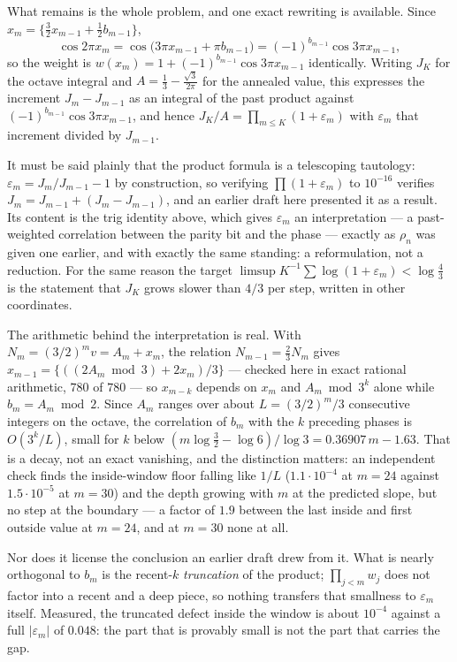 \documentclass[11pt]{article}
\theoremstyle{remark}
\newcommand{\eps}{\varepsilon}
\begin{document}
What remains is the whole problem, and one exact rewriting is available. Since
$x_m=\{\tfrac32x_{m-1}+\tfrac12b_{m-1}\}$,
\[
  \cos2\pi x_m=\cos\bigl(3\pi x_{m-1}+\pi b_{m-1}\bigr)=(-1)^{b_{m-1}}\cos3\pi x_{m-1},
\]
so the weight is $w(x_m)=1+(-1)^{b_{m-1}}\cos3\pi x_{m-1}$ identically. Writing $J_K$ for the octave
integral and $A=\tfrac13-\tfrac{\sqrt3}{2\pi}$ for the annealed value, this expresses the increment
$J_m-J_{m-1}$ as an integral of the past product against $(-1)^{b_{m-1}}\cos3\pi x_{m-1}$, and hence
$J_K/A=\prod_{m\le K}(1+\eps_m)$ with $\eps_m$ that increment divided by $J_{m-1}$.

It must be said plainly that the product formula is a telescoping tautology: $\eps_m=J_m/J_{m-1}-1$ by
construction, so verifying $\prod(1+\eps_m)$ to $10^{-16}$ verifies $J_m=J_{m-1}+(J_m-J_{m-1})$, and an
earlier draft here presented it as a result. Its content is the trig identity above, which gives $\eps_m$
an interpretation --- a past-weighted correlation between the parity bit and the phase --- exactly as
$\rho_n$ was given one earlier, and with exactly the same standing: a reformulation, not a reduction. For
the same reason the target $\limsup K^{-1}\sum\log(1+\eps_m)<\log\tfrac43$ is the statement that $J_K$
grows slower than $4/3$ per step, written in other coordinates.

The arithmetic behind the interpretation is real. With $N_m=(3/2)^mv=A_m+x_m$, the relation
$N_{m-1}=\tfrac23N_m$ gives $x_{m-1}=\{((2A_m\bmod3)+2x_m)/3\}$ --- checked here in exact rational
arithmetic, $780$ of $780$ --- so $x_{m-k}$ depends on $x_m$ and $A_m\bmod3^k$ alone while $b_m=A_m\bmod2$.
Since $A_m$ ranges over about $L=(3/2)^m/3$ consecutive integers on the octave, the correlation of $b_m$
with the $k$ preceding phases is $O(3^k/L)$, small for $k$ below
$(m\log\tfrac32-\log6)/\log3=0.36907\,m-1.63$. That is a decay, not an exact vanishing, and the
distinction matters: an independent check finds the inside-window floor falling like $1/L$
($1.1\cdot10^{-4}$ at $m=24$ against $1.5\cdot10^{-5}$ at $m=30$) and the depth growing with $m$ at the
predicted slope, but no step at the boundary --- a factor of $1.9$ between the last inside and first
outside value at $m=24$, and at $m=30$ none at all.

Nor does it license the conclusion an earlier draft drew from it. What is nearly orthogonal to $b_m$ is
the recent-$k$ \emph{truncation} of the product; $\prod_{j<m}w_j$ does not factor into a recent and a deep
piece, so nothing transfers that smallness to $\eps_m$ itself. Measured, the truncated defect inside the
window is about $10^{-4}$ against a full $|\eps_m|$ of $0.048$: the part that is provably small is not the
part that carries the gap.
\end{document}
